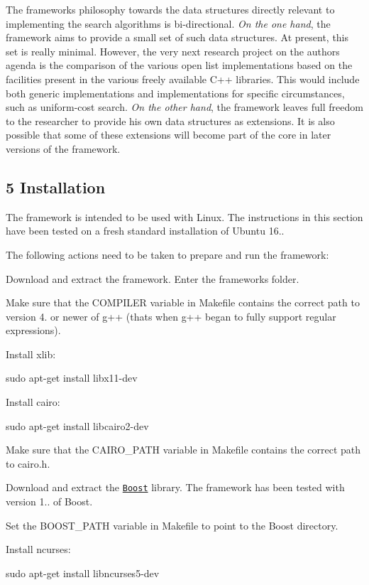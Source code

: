 The framework\textquotesingle{}s philosophy towards the data structures directly relevant to implementing the search algorithms is bi-\/directional. {\itshape On the one hand}, the framework aims to provide a small set of such data structures. At present, this set is really minimal. However, the very next research project on the author\textquotesingle{}s agenda is the comparison of the various open list implementations based on the facilities present in the various freely available C++ libraries. This would include both generic implementations and implementations for specific circumstances, such as uniform-\/cost search. {\itshape On the other hand}, the framework leaves full freedom to the researcher to provide his own data structures as extensions. It is also possible that some of these extensions will become part of the core in later versions of the framework.\hypertarget{index_s-install}{}\subsection{5 Installation}\label{index_s-install}
The framework is intended to be used with {\ttfamily Linux}. The instructions in this section have been tested on a fresh standard installation of {\ttfamily Ubuntu 16.}.

The following actions need to be taken to prepare and run the framework\+:
\begin{DoxyEnumerate}
\item Download and extract the framework. Enter the framework\textquotesingle{}s folder.
\item Make sure that the {\ttfamily C\+O\+M\+P\+I\+L\+ER} variable in {\ttfamily Makefile} contains the correct path to version 4. or newer of {\ttfamily g++} (that\textquotesingle{}s when {\ttfamily g++} began to fully support regular expressions).
\item Install {\ttfamily xlib}\+: \begin{DoxyVerb}sudo apt-get install libx11-dev
\end{DoxyVerb}

\item Install {\ttfamily cairo}\+: \begin{DoxyVerb}sudo apt-get install libcairo2-dev
\end{DoxyVerb}

\item Make sure that the {\ttfamily C\+A\+I\+R\+O\+\_\+\+P\+A\+TH} variable in {\ttfamily Makefile} contains the correct path to {\ttfamily cairo.\+h}.
\item Download and extract the \href{http://www.boost.org/users/download/}{\tt Boost} library. The framework has been tested with version 1.. of Boost.
\item Set the {\ttfamily B\+O\+O\+S\+T\+\_\+\+P\+A\+TH} variable in {\ttfamily Makefile} to point to the {\ttfamily Boost} directory.
\item Install {\ttfamily ncurses}\+: \begin{DoxyVerb}sudo apt-get install libncurses5-dev
\end{DoxyVerb}

\end{DoxyEnumerate}

